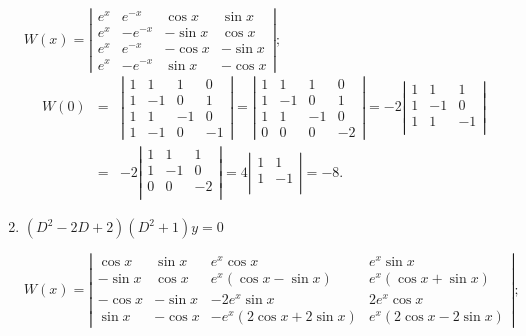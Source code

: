 \documentclass{ximera}
\begin{document}
\begin{problem}
\begin{enumerate}
\begin{solution}
$
W(x)=\left|\begin{array}{rrrr}e^x&e^{-x}&\cos x&\sin x\\
e^x&-e^{-x}&-\sin x&\cos x\\e^x&e^{-x}&-\cos x&-\sin
x\\e^x&-e^{-x}&\sin x&-\cos x\end{array}\right|;
$
\begin{eqnarray*}
W(0)&=&\left|\begin{array}{rrrr}
1&1&1&0\\1&-1&0&1\\1&1&-1&0\\1&-1&0&-1
\end{array}\right|
=\left|\begin{array}{rrrr}
1&1&1&0\\1&-1&0&1\\1&1&-1&0\\0&0&0&-2
\end{array}\right|
=-2\left|\begin{array}{rrrr}
1&1&1\\1&-1&0\\1&1&-1\\
\end{array}\right|\\
&=&-2\left|\begin{array}{rrrr}
1&1&1\\1&-1&0\\0&0&-2\\
\end{array}\right|
=4\left|\begin{array}{rrrr}
1&1\\1&-1\\\end{array}\right|=-8.
\end{eqnarray*}
\end{solution}

    \item $(D^2-2D+2)(D^2+1)y=0$

\begin{solution}
$
W(x)=\left|\begin{array}{rrcc}\cos x&\sin x&e^x\cos x&e^x\sin x\\
-\sin x&\cos x&e^x(\cos x-\sin x)&e^x(\cos x+\sin x)\\
-\cos x&-\sin x&-2e^x\sin x&2e^x\cos x\\
\sin x&-\cos x&-e^x(2\cos x+2\sin x)&e^x(2\cos x-2\sin x)
\end{array}\right|;
$


\end{solution}
\end{enumerate}
\end{problem}
\end{document}
